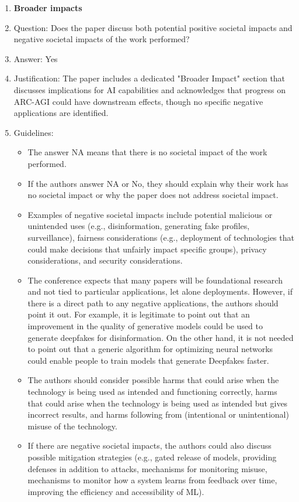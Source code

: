 \documentclass{article}
\newcommand{\answerYes}[1][]{Yes}
\begin{document}
\begin{enumerate}
\item {\bf Broader impacts}
    \item[] Question: Does the paper discuss both potential positive societal impacts and negative societal impacts of the work performed?
    \item[] Answer: \answerYes{}
    \item[] Justification: The paper includes a dedicated "Broader Impact" section that discusses implications for AI capabilities and acknowledges that progress on ARC-AGI could have downstream effects, though no specific negative applications are identified.
    \item[] Guidelines:
    \begin{itemize}
        \item The answer NA means that there is no societal impact of the work performed.
        \item If the authors answer NA or No, they should explain why their work has no societal impact or why the paper does not address societal impact.
        \item Examples of negative societal impacts include potential malicious or unintended uses (e.g., disinformation, generating fake profiles, surveillance), fairness considerations (e.g., deployment of technologies that could make decisions that unfairly impact specific groups), privacy considerations, and security considerations.
        \item The conference expects that many papers will be foundational research and not tied to particular applications, let alone deployments. However, if there is a direct path to any negative applications, the authors should point it out. For example, it is legitimate to point out that an improvement in the quality of generative models could be used to generate deepfakes for disinformation. On the other hand, it is not needed to point out that a generic algorithm for optimizing neural networks could enable people to train models that generate Deepfakes faster.
        \item The authors should consider possible harms that could arise when the technology is being used as intended and functioning correctly, harms that could arise when the technology is being used as intended but gives incorrect results, and harms following from (intentional or unintentional) misuse of the technology.
        \item If there are negative societal impacts, the authors could also discuss possible mitigation strategies (e.g., gated release of models, providing defenses in addition to attacks, mechanisms for monitoring misuse, mechanisms to monitor how a system learns from feedback over time, improving the efficiency and accessibility of ML).
    \end{itemize}
    

\end{enumerate}
\end{document}
